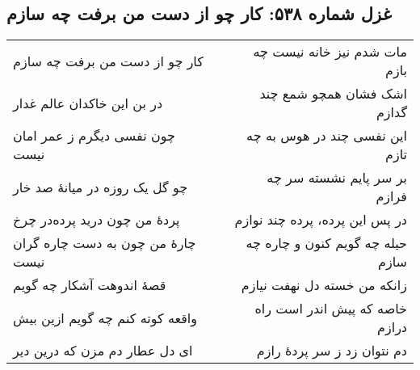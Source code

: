 \begin{center}
\section*{غزل شماره ۵۳۸: کار چو از دست من برفت چه سازم}
\label{sec:538}
\begin{longtable}{l p{0.5cm} r}
کار چو از دست من برفت چه سازم
&&
مات شدم نیز خانه نیست چه بازم
\\
در بن این خاکدان عالم غدار
&&
اشک فشان همچو شمع چند گدازم
\\
چون نفسی دیگرم ز عمر امان نیست
&&
این نفسی چند در هوس به چه تازم
\\
چو گل یک روزه در میانهٔ صد خار
&&
بر سر پایم نشسته سر چه فرازم
\\
پردهٔ من چون درید پرده‌در چرخ
&&
در پس این پرده، پرده چند نوازم
\\
چارهٔ من چون به دست چاره گران نیست
&&
حیله چه گویم کنون و چاره چه سازم
\\
قصهٔ اندوهت آشکار چه گویم
&&
زانکه من خسته دل نهفت نیازم
\\
واقعه کوته کنم چه گویم ازین بیش
&&
خاصه که پیش اندر است راه درازم
\\
ای دل عطار دم مزن که درین دیر
&&
دم نتوان زد ز سر پردهٔ رازم
\\
\end{longtable}
\end{center}
